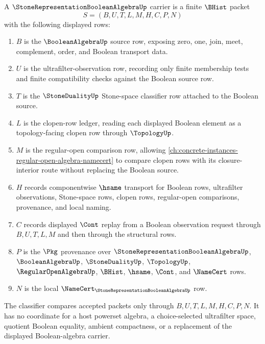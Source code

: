 \begin{definition}
\label{def:stone-representation-boolean-algebra-carrier}
A $\StoneRepresentationBooleanAlgebraUp$ carrier is a finite $\BHist$ packet
$$
S=(B,U,T,L,M,H,C,P,N)
$$
with the following displayed rows:
\begin{enumerate}
\item $B$ is the $\BooleanAlgebraUp$ source row, exposing zero, one, join, meet, complement, order, and Boolean transport data.
\item $U$ is the ultrafilter-observation row, recording only finite membership tests and finite compatibility checks against the Boolean source row.
\item $T$ is the $\StoneDualityUp$ Stone-space classifier row attached to the Boolean source.
\item $L$ is the clopen-row ledger, reading each displayed Boolean element as a topology-facing clopen row through $\TopologyUp$.
\item $M$ is the regular-open comparison row, allowing \autoref{ch:concrete-instances-regular-open-algebra-namecert} to compare clopen rows with its closure-interior route without replacing the Boolean source.
\item $H$ records componentwise $\hsame$ transport for Boolean rows, ultrafilter observations, Stone-space rows, clopen rows, regular-open comparisons, provenance, and local naming.
\item $C$ records displayed $\Cont$ replay from a Boolean observation request through $B,U,T,L,M$ and then through the structural rows.
\item $P$ is the $\Pkg$ provenance over $\StoneRepresentationBooleanAlgebraUp$, $\BooleanAlgebraUp$, $\StoneDualityUp$, $\TopologyUp$, $\RegularOpenAlgebraUp$, $\BHist$, $\hsame$, $\Cont$, and $\NameCert$ rows.
\item $N$ is the local $\NameCert_{\StoneRepresentationBooleanAlgebraUp}$ row.
\end{enumerate}
The classifier compares accepted packets only through $B,U,T,L,M,H,C,P,N$. It has no coordinate for a host powerset algebra, a choice-selected ultrafilter space, quotient Boolean equality, ambient compactness, or a replacement of the displayed Boolean-algebra carrier.
\end{definition}


